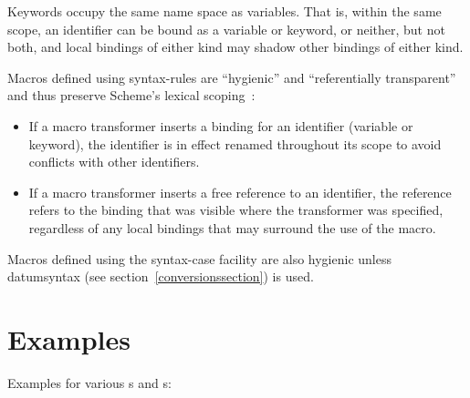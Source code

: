 Keywords occupy the same name space as variables.
That is, within the same
scope, an identifier can be bound as a variable or keyword, or neither, but
not both, and local bindings of either kind may shadow other bindings of
either kind.

Macros defined using {\cf syntax-rules} are ``hygienic'' and ``referentially
transparent'' and thus preserve Scheme's lexical scoping~\cite{Kohlbecker86,
hygienic,Bawden88,macrosthatwork,syntacticabstraction}:

\begin{itemize}
\item If a macro transformer inserts a binding for an identifier
(variable or keyword), the identifier is in effect renamed
throughout its scope to avoid conflicts with other identifiers.

\item If a macro transformer inserts a free reference to an
identifier, the reference refers to the binding that was visible
where the transformer was specified, regardless of any local
bindings that may surround the use of the macro.
\end{itemize}

Macros defined using the {\cf syntax-case} facility are also
hygienic unless {\cf datum\coerce{}syntax}
(see section~\ref{conversionssection}) is used.

\section{Examples}

Examples for various s and s:

